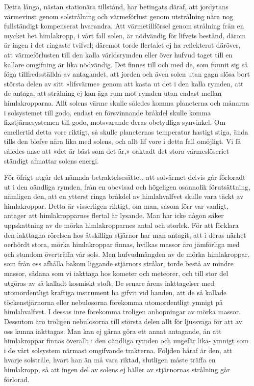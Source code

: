 \documentclass[a4paper, 12pt, oneside, swedish]{article}
\begin{document}
Detta långa, nästan stationära tillstånd, har betingats däraf, att jordytans värmevinst genom solstrålning och värmeförlust genom utstrålning nära nog fullständigt kompenserat hvarandra. Att värmetillförsel genom strålning från en mycket het himlakropp, i vårt fall solen, är nödvändig för lifvets bestånd, därom är ingen i det ringaste tvifvel; däremot torde flertalet ej ha reflekterat däröver, att värmeförlusten till den kalla världsrymden eller över hufvud taget till en kallare omgifning är lika nödvändig. Det finnes till och med de, som funnit sig så föga tillfredsställda av antagandet, att jorden och även solen utan gagn slösa bort största delen av sitt »lifsvärme» genom att kasta ut det i den kalla rymden, att de antaga, att strålning ej kan äga rum mot rymden utan endast mellan himlakropparna. Allt solens värme skulle således komma planeterna och månarna i solsystemet till godo, endast en försvinnande bråkdel skulle komma fixstjärnesystemen till godo, motsvarande deras obetydliga synvinkel. Om emellertid detta vore riktigt, så skulle planeternas temperatur hastigt stiga, ända tills den blefve nära lika med solens, och allt lif vore i detta fall omöjligt. Vi få således anse att »det är bäst som det är,» oaktadt det stora värmeslöseriet ständigt afmattar solens energi.

För öfrigt utgår det nämnda betraktelsesättet, att solvärmet delvis går förloradt ut i den oändliga rymden, från en obevisad och högeligen osannolik förutsättning, nämligen den, att en ytterst ringa bråkdel av himlahvalfvet skulle vara täckt av himlakroppar. Detta är visserligen riktigt, om man, såsom förr var vanligt, antager att himlakropparnes flertal är lysande. Man har icke någon säker uppskattning av de mörka himlakropparnes antal och storlek. För att förklara den iakttagna rörelsen hos åtskilliga stjärnor har man antagit, att i deras närhet oerhördt stora, mörka himlakroppar finnas, hvilkas massor äro jämförliga med och stundom överträffa vår sols. Men hufvudmängden av de mörka himlakroppar, som från oss afhålla bakom liggande stjärnors strålar, torde bestå av mindre massor, sådana som vi iakttaga hos kometer och meteorer, och till stor del utgöras av så kalladt kosmiskt stoft. De senare årens iakttagelser med utomordentligt kraftiga instrument ha gifvit vid handen, att de så kallade töckenstjärnorna eller nebulosorna förekomma utomordentligt ymnigt på himlahvalfvet. I dessas inre förekomma troligen anhopningar av mörka massor. Dessutom äro troligen nebulosorna till största delen allt för ljussvaga för att av oss kunna iakttagas. Man kan ej gärna göra ett annat antagande, än att himlakroppar finnas överallt i den oändliga rymden och ungefär lika- ymnigt som i de vårt solsystem närmast omgifvande trakterna. Följden häraf är den, att hvarje solstråle, hvart han än må vara riktad, slutligen måste träffa en himlakropp, så att ingen del av solens ej häller av stjärnornas strålning går förlorad.
\end{document}
